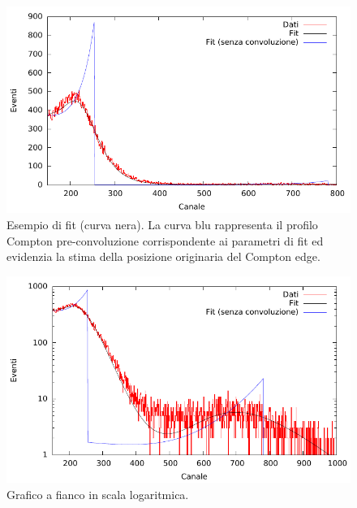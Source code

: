 \documentclass[a4paper,11pt,italian]{report}
\begin{document}
\begin{minipage}{0.45\linewidth}
\begin{figure}[H]
\centering
\includegraphics[width=\columnwidth,keepaspectratio]{../out/plot1730lin}
\caption{\small{Esempio di fit (curva nera). La curva blu rappresenta il profilo Compton pre-convoluzione corrispondente ai parametri di fit ed evidenzia la stima della posizione originaria del Compton edge.}}
\end{figure}
\end{minipage}
\hspace{\hfill}
\begin{minipage}{0.45\linewidth}
\begin{figure}[H]
\centering
\includegraphics[width=\columnwidth,keepaspectratio]{../out/plot1730log}
\caption{\small{Grafico a fianco in scala logaritmica.}}
\end{figure}
\end{minipage}

~\\
\end{document}
